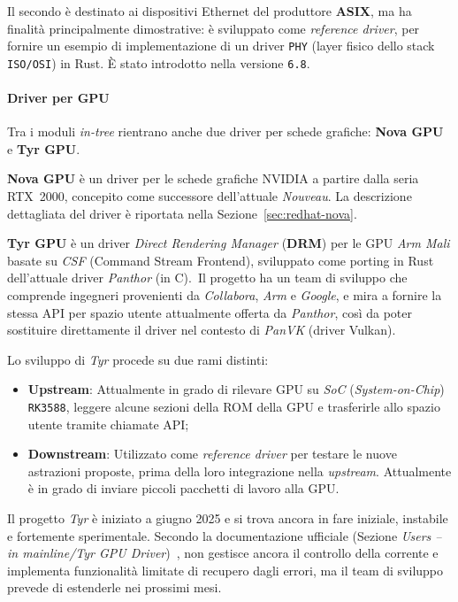 Il secondo è destinato ai dispositivi Ethernet del produttore \textbf{ASIX}, ma ha finalità principalmente dimostrative:
è sviluppato come \textit{reference driver}, per fornire un esempio di implementazione di un driver \texttt{PHY} (layer fisico dello stack \texttt{ISO/OSI}) in Rust.
È stato introdotto nella versione \texttt{6.8}.

\paragraph{Driver per GPU}
Tra i moduli \textit{in-tree} rientrano anche due driver per schede grafiche: \textbf{Nova GPU} e \textbf{Tyr GPU}.\ 

\textbf{Nova GPU} è un driver per le schede grafiche NVIDIA a partire dalla seria RTX~2000, concepito come successore dell'attuale \textit{Nouveau}.
La descrizione dettagliata del driver è riportata nella Sezione~\ref{sec:redhat-nova}.

\textbf{Tyr GPU} è un driver \textit{Direct Rendering Manager} (\textbf{DRM}) per le GPU \textit{Arm Mali} basate su \textit{CSF} (Command Stream Frontend), 
sviluppato come porting in Rust dell'attuale driver \textit{Panthor} (in C).\ 
Il progetto ha un team di sviluppo che comprende ingegneri provenienti da \textit{Collabora}, \textit{Arm} e \textit{Google}, e mira a fornire la 
stessa API per spazio utente attualmente offerta da \textit{Panthor}, così da poter sostituire direttamente il driver nel contesto di \textit{PanVK} (driver Vulkan).

\noindent Lo sviluppo di \textit{Tyr} procede su due rami distinti:
\begin{itemize}
    \item \textbf{Upstream}: Attualmente in grado di rilevare GPU su \textit{SoC} (\textit{System-on-Chip}) \texttt{RK3588}, leggere alcune sezioni della ROM della GPU e trasferirle allo spazio utente tramite chiamate API;\ 
    \item \textbf{Downstream}: Utilizzato come \textit{reference driver} per testare le nuove astrazioni proposte, prima della loro integrazione nella \textit{upstream}. Attualmente è in grado di inviare piccoli pacchetti di lavoro alla GPU.\ 
\end{itemize}
Il progetto \textit{Tyr} è iniziato a giugno 2025 e si trova ancora in fare iniziale, instabile e fortemente sperimentale.
Secondo la documentazione ufficiale (Sezione \textit{Users -- in mainline/Tyr GPU Driver})~\cite{rust-for-linux}, non gestisce ancora il controllo della corrente e implementa funzionalità limitate di recupero dagli errori, 
ma il team di sviluppo prevede di estenderle nei prossimi mesi.

